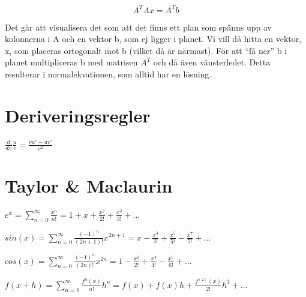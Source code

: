 \documentclass[12pt,a4paper]{article}
\begin{document}
$$ A^TAx = A^Tb $$

Det går att visualisera det som att det finns ett plan som spänns upp av kolonnerna i A och en vektor b, som ej ligger i planet. Vi vill då hitta en vektor, x, som placeras ortogonalt mot b (vilket då är närmast). För att ``få ner'' b i planet multipliceras b med matrisen $A^T$ och då även vänsterledet. Detta resulterar i normalekvationen, som alltid har en lösning.

\section{Deriveringsregler}
$\frac{d}{dx}\frac{u}{v} = \frac{vu'-uv'}{v^2}$

\section{Taylor \& Maclaurin}

\LARGE
$ e^x = \sum_{n=0}^{\infty} \frac{x^n}{n!} = 1 + x + \frac{x^2}{2!} + \frac{x^3}{3!} + \ldots $

$ sin(x) = \sum_{n=0}^{\infty} \frac{(-1)^n}{(2n+1)!} x^{2n+1} = x - \frac{x^3}{3!} + \frac{x^5}{5!} - \frac{x^7}{7!} + \ldots$

$ cos(x) = \sum_{n=0}^{\infty} \frac{(-1)^n}{(2n)!} x^{2n} = 1 - \frac{x^2}{2!} + \frac{x^4}{4!} - \frac{x^6}{6!} + \ldots$

$ f(x+h) = \sum_{n=0}^{\infty} \frac{f^n(x)}{n!}h^n = f(x) + f(x)h + \frac{f^{(2)}(x)}{2!}h^3 + \ldots $
\end{document}
